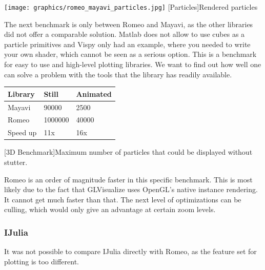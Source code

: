 \begin{minipage}{\linewidth}
    \centering
    \texttt{[image: graphics/romeo\_mayavi\_particles.jpg]}
    [Particles]{Rendered particles}
    \label{fig:reactive1}
\end{minipage}

The next benchmark is only between Romeo and Mayavi, as the other libraries did not offer a comparable solution. Matlab does not allow to use cubes as a particle primitives and Vispy only had an example, where you needed to write your own shader, which cannot be seen as a serious option. This is a benchmark for easy to use and high-level plotting libraries. We want to find out how well one can solve a problem with the tools that the library has readily available.

\begin{table}[htbp]
    \centering
    \begin{tabular}{l|l|l}
        \hline
        \textbf{Library} & \textbf{Still}  & \textbf{Animated}  \\ 
        \hline
        Mayavi           & 90000           & 2500  \\
        Romeo            & 1000000         & 40000 \\
        \hline
        \hline
        Speed up         & 11x             & 16x \\
    \end{tabular}
    [3D Benchmark]{Maximum number of particles that could be displayed without stutter.}
    \label{table:relativespeedoglw}
\end{table}

Romeo is an order of magnitude faster in this specific benchmark. This is most likely due to the fact that GLVisualize uses OpenGL's native instance rendering.
It cannot get much faster than that. The next level of optimizations can be culling, which would only give an advantage at certain zoom levels.

\subsubsection{IJulia}

It was not possible to compare IJulia directly with Romeo, as the feature set for plotting is too different.

